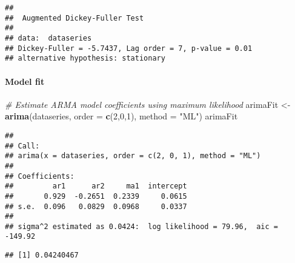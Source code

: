\documentclass[]{article}
\newenvironment{Shaded}{\begin{snugshade}}{\end{snugshade}}
\newcommand{\KeywordTok}[1]{\textcolor[rgb]{0.13,0.29,0.53}{\textbf{#1}}}
\newcommand{\DataTypeTok}[1]{\textcolor[rgb]{0.13,0.29,0.53}{#1}}
\newcommand{\DecValTok}[1]{\textcolor[rgb]{0.00,0.00,0.81}{#1}}
\newcommand{\StringTok}[1]{\textcolor[rgb]{0.31,0.60,0.02}{#1}}
\newcommand{\CommentTok}[1]{\textcolor[rgb]{0.56,0.35,0.01}{\textit{#1}}}
\newcommand{\OperatorTok}[1]{\textcolor[rgb]{0.81,0.36,0.00}{\textbf{#1}}}
\newcommand{\NormalTok}[1]{#1}
\let\oldparagraph\paragraph
\renewcommand{\paragraph}[1]{\oldparagraph{#1}\mbox{}}
\begin{document}
\begin{verbatim}
## 
##  Augmented Dickey-Fuller Test
## 
## data:  dataseries
## Dickey-Fuller = -5.7437, Lag order = 7, p-value = 0.01
## alternative hypothesis: stationary
\end{verbatim}

\paragraph{Model fit}\label{model-fit}

\begin{Shaded}
\begin{Highlighting}[]
\CommentTok{# Estimate ARMA model coefficients using maximum likelihood}
\NormalTok{arimaFit <-}\StringTok{ }\KeywordTok{arima}\NormalTok{(dataseries, }\DataTypeTok{order =} \KeywordTok{c}\NormalTok{(}\DecValTok{2}\NormalTok{,}\DecValTok{0}\NormalTok{,}\DecValTok{1}\NormalTok{), }\DataTypeTok{method =} \StringTok{"ML"}\NormalTok{)}
\NormalTok{arimaFit}
\end{Highlighting}
\end{Shaded}

\begin{verbatim}
## 
## Call:
## arima(x = dataseries, order = c(2, 0, 1), method = "ML")
## 
## Coefficients:
##         ar1      ar2     ma1  intercept
##       0.929  -0.2651  0.2339     0.0615
## s.e.  0.096   0.0829  0.0968     0.0337
## 
## sigma^2 estimated as 0.0424:  log likelihood = 79.96,  aic = -149.92
\end{verbatim}

\begin{Shaded}
\end{Shaded}

\begin{verbatim}
## [1] 0.04240467
\end{verbatim}

\begin{Shaded}
\end{Shaded}
\end{document}
